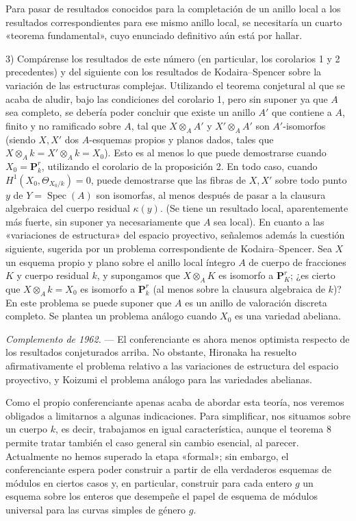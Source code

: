 Para pasar de resultados conocidos para la completación de un anillo local a
los resultados correspondientes para ese mismo anillo local, se necesitaría un
cuarto «teorema fundamental», cuyo enunciado definitivo aún está por hallar.

3) Compárense los resultados de este número (en particular, los corolarios 1 y
2 precedentes) y del siguiente con los resultados de Kodaira--Spencer sobre la
variación de las estructuras complejas. Utilizando el teorema conjetural al que
se acaba de aludir, bajo las condiciones del corolario 1, pero sin suponer ya
que $A$ sea completo, se debería poder concluir que existe un anillo $A'$ que
contiene a $A$, finito y no ramificado sobre $A$, tal que $X\otimes_A A'$ y
$X'\otimes_A A'$ son $A'$-isomorfos (siendo $X,X'$ dos $A$-esquemas propios y
planos dados, tales que $X\otimes_A k=X'\otimes_A k=X_0$). Esto es al menos lo
que puede demostrarse cuando $X_0=\mathbf P_k^r$, utilizando el corolario de la
proposición 2. En todo caso, cuando $H^1(X_0,\Theta_{X_0/k})=0$, puede
demostrarse que las fibras de $X,X'$ sobre todo punto $y$ de
$Y=\operatorname{Spec}(A)$ son isomorfas, al menos después de pasar a la
clausura algebraica del cuerpo residual $\kappa(y)$. (Se tiene un resultado
local, aparentemente más fuerte, sin suponer ya necesariamente que $A$ sea
local). En cuanto a las «variaciones de estructura» del espacio proyectivo,
señalemos además la cuestión siguiente, sugerida por un problema correspondiente
de Kodaira--Spencer. Sea $X$ un esquema propio y plano sobre el anillo local
íntegro $A$ de cuerpo de fracciones $K$ y cuerpo residual $k$, y supongamos que
$X\otimes_A K$ es isomorfo a $\mathbf P_K^r$; ¿es cierto que
$X\otimes_A k=X_0$ es isomorfo a $\mathbf P_k^r$ (al menos sobre la clausura
algebraica de $k$)? En este problema se puede suponer que $A$ es un anillo de
valoración discreta completo. Se plantea un problema análogo cuando $X_0$ es
una variedad abeliana.

\emph{Complemento de 1962.} --- El conferenciante es ahora menos optimista
respecto de los resultados conjeturados arriba. No obstante, Hironaka ha
resuelto afirmativamente el problema relativo a las variaciones de estructura
del espacio proyectivo, y Koizumi el problema análogo para las variedades
abelianas.


Como el propio conferenciante apenas acaba de abordar esta teoría, nos veremos
obligados a limitarnos a algunas indicaciones. Para simplificar, nos situamos
sobre un cuerpo $k$, es decir, trabajamos en igual característica, aunque el
teorema 8 permite tratar también el caso general sin cambio esencial, al
parecer. Actualmente no hemos superado la etapa «formal»; sin embargo, el
conferenciante espera poder construir a partir de ella verdaderos esquemas de
módulos en ciertos casos y, en particular, construir para cada entero $g$ un
esquema sobre los enteros que desempeñe el papel de esquema de módulos universal
para las curvas simples de género $g$.

